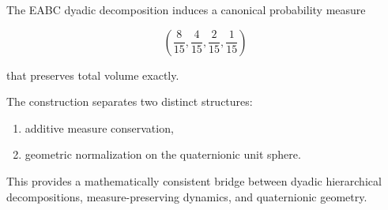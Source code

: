 \documentclass[11pt]{article}
\begin{document}
	The EABC dyadic decomposition induces a canonical probability measure
	
	\[
	\left(
	\frac8{15},
	\frac4{15},
	\frac2{15},
	\frac1{15}
	\right)
	\]
	
	that preserves total volume exactly.
	
	The construction separates two distinct structures:
	
	\begin{enumerate}
		\item additive measure conservation,
		\item geometric normalization on the quaternionic unit sphere.
	\end{enumerate}
	
	This provides a mathematically consistent bridge between
	dyadic hierarchical decompositions,
	measure-preserving dynamics,
	and quaternionic geometry.
	
\end{document}
